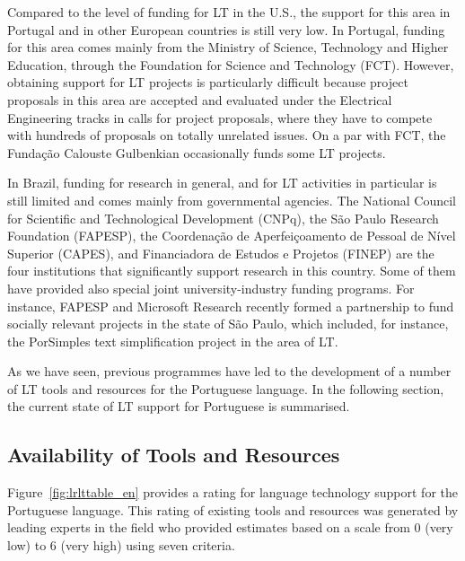 \documentclass[]{../metanetpaper}
\begin{document}
\begin{multicols}{2}
Compared to the level of funding for LT in the U.S., the support for this area in Portugal and in other European countries is still very low. In Portugal, funding for this area comes mainly from the Ministry of Science, Technology and Higher Education, through the Foundation for Science and Technology (FCT). However, obtaining support for LT projects is particularly difficult because project proposals in this area are accepted and evaluated under the Electrical Engineering tracks in calls for project proposals, where they have to compete with hundreds of proposals on totally unrelated issues. On a par with FCT, the Fundação Calouste Gulbenkian occasionally funds some LT projects.

In Brazil, funding for research in general, and for LT activities in particular is still limited and comes mainly from governmental agencies. The National Council for Scientific and Technological Development (CNPq), the São Paulo Research Foundation (FAPESP), the Coordenação de Aperfeiçoamento de Pessoal de Nível Superior (CAPES), and Financiadora de Estudos e Projetos (FINEP) are the four institutions that significantly support research in this country. Some of them have provided also special joint university-industry funding programs. For instance, FAPESP and Microsoft Research recently formed a partnership to fund socially relevant projects in the state of São Paulo, which included, for instance, the PorSimples\cite{porsimples} text simplification project in the area of LT. 

As we have seen, previous programmes have led to the development of a number of LT tools and resources for the Portuguese language. In the following section, the current state of LT support for Portuguese is summarised.
  
\subsection{Availability of Tools and Resources}

Figure~\ref{fig:lrlttable_en} provides a rating for language technology support for the Portuguese language. This rating of existing tools and resources was generated by leading experts in the field who provided estimates based on a scale from 0 (very low) to 6 (very high) using seven criteria.


\end{multicols}
\end{document}
